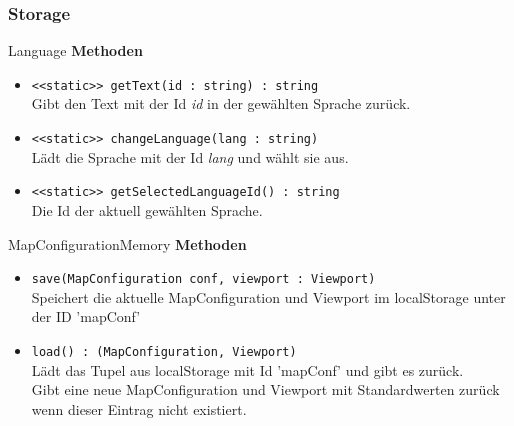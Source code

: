 \subsubsection{Storage}

\begin{Class}{Language}
    \textbf{Methoden}
    \begin{itemize}
        \item \texttt{<<static>> getText(id : string) : string}
        \\ Gibt den Text mit der Id \emph{id} in der gewählten Sprache zurück.
        \item \texttt{<<static>> changeLanguage(lang : string)}
        \\ Lädt die Sprache mit der Id \emph{lang} und wählt sie aus.
        \item \texttt{<<static>> getSelectedLanguageId() : string}
        \\ Die Id der aktuell gewählten Sprache.
    \end{itemize}

\end{Class}


\begin{Class}{MapConfigurationMemory}
    \textbf{Methoden}
    \begin{itemize}
        \item \texttt{save(MapConfiguration conf, viewport : Viewport)}
        \\ Speichert die aktuelle MapConfiguration und Viewport im localStorage unter der ID 'mapConf'
        \item \texttt{load() : (MapConfiguration, Viewport)}
        \\ Lädt das Tupel aus localStorage mit Id 'mapConf' und gibt es zurück.
        \\ Gibt eine neue MapConfiguration und Viewport mit Standardwerten zurück wenn 
        dieser Eintrag nicht existiert.
    \end{itemize}

\end{Class}